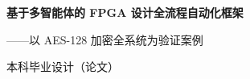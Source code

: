 \documentclass[12pt,a4paper]{report}
\begin{document}
\begin{titlepage}
\centering
\vspace*{3cm}
{\Huge\bfseries 基于多智能体的 FPGA 设计全流程自动化框架\par}
\vspace{1.5cm}
{\LARGE ——以 AES-128 加密全系统为验证案例\par}
\vspace{3cm}
{\Large 本科毕业设计（论文）\par}
\vspace{4cm}
\end{titlepage}

\tableofcontents
\clearpage









\end{document}
